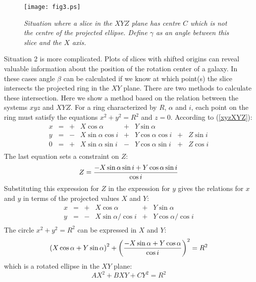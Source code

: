 \documentclass[11pt,a4paper]{article}
\begin{document}
\begin{figure}
   \centering
   \texttt{[image: fig3.ps]}
   \caption{\it Situation where a slice in the $XYZ$ plane has 
    centre $C$ which is not the centre of the projected ellipse. 
    Define $\gamma$ as an angle between this slice and the $X$ axis.}
   \label{fig:fig3}
\end{figure}
 
Situation 2 is more complicated. Plots of slices with shifted origins can reveal 
valuable information about the position of the rotation center of a galaxy.
In these cases angle $\beta$ can be calculated if we 
know at which point(s) the slice intersects the projected ring in the
$XY$ plane. There are two methods to calculate these intersection. Here we show 
a method based on the relation between the systems $xyz$ and $XYZ$.
For a ring characterized by $R$, $\alpha$ and $i$, each point
on the ring must satisfy the equations $x^2+y^2=R^2$ and $z=0$. 
According to (\ref{xyzXYZ}):
$$
\begin{array} {rllllllll}
x & = &+&X \cos \alpha        & + & Y \sin \alpha            &   & \nonumber \\
y & = &-&X \sin \alpha \cos i & + & Y \cos \alpha \cos i & + & Z \sin i\nonumber\\
0 & = &+&X \sin \alpha \sin i & - & Y \cos \alpha \sin i & + & Z \cos i \nonumber\\
\end{array}
$$
The last equation sets a constraint on $Z$:
$$
Z = {{-X\sin \alpha \sin i + Y\cos \alpha \sin i}\over{\cos i}}
$$
Substituting this expression for $Z$ in the expression for $y$ gives the 
relations for $x$ and $y$ in terms of the projected values $X$ and $Y$:
$$
\begin{array} {rllllll}
x & = & + & X \cos \alpha          & + & Y \sin \alpha  \nonumber\\
y & = & - & X \sin \alpha / \cos i & + & Y \cos \alpha / \cos i \nonumber\\
\end{array}
$$
The circle $x^2+y^2=R^2$ can be expressed in $X$ and $Y$:
\begin{equation}
{(X \cos \alpha + Y \sin \alpha)}^2 
+ { \left({{-X \sin \alpha  + Y \cos \alpha}\over{\cos i}}\right) }^2 = R^2
\label{projectedring}
\end{equation}
which is a rotated ellipse in the $XY$ plane:
\begin{equation}
A X^2 + B XY + C Y^2 = R^2
\end{equation}
\end{document}
